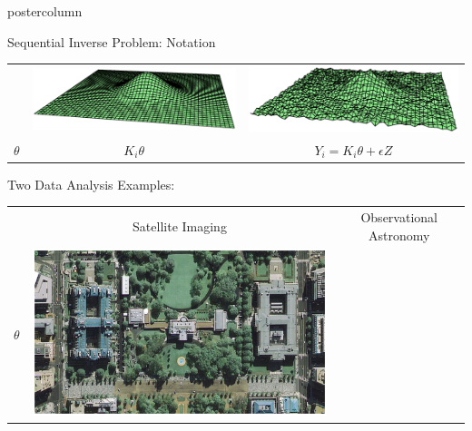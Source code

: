\documentclass[final]{beamer}
\begin{document}
\begin{frame}
\begin{columns}
\begin{column}{.32\textwidth}
\begin{beamercolorbox}[center,wd=\textwidth]{postercolumn}
\begin{minipage}[T]{.95\textwidth}
{\begin{block}{Sequential Inverse Problem: Notation}
\begin{table}
\begin{tabular}{ccc}
& \includegraphics[width=2.6in,trim=100 225 0 235,clip]{./figures/inverseProblemEx2c.eps} 
& \includegraphics[width=2.6in,trim=100 225 0 235,clip]{./figures/inverseProblemEx3c.eps} \\
$\theta$ & $K_i\theta$ & $Y_i = K_i\theta + \epsilon Z$ 
\end{tabular}
\end{table}
            \end{block}
            \begin{block}{Two Data Analysis Examples: }
              \begin{table}
                \centering
                \begin{tabular}{c c c}
                  \begin{minipage}[r][1.5in][c]{3cm}
                  \end{minipage} &
                  \begin{minipage}[c][1.5in][c]{6in}
                  \textcolor{green!50!black}{Satellite Imaging}
                  \end{minipage} &
                  \begin{minipage}[c][1.5in][c]{6in}
                  \textcolor{green!50!black}{Observational Astronomy}
                  \end{minipage} 
                  \\
                  \begin{minipage}[r][2.5in][c]{3cm}
                  $\theta$
                  \end{minipage} &
                  \begin{minipage}[c][2.5in][c]{6in}
                    \includegraphics[width=5in,trim=80 130 80 90,clip]{./figures/satelliteColor.eps}

\end{minipage}
\end{tabular}
\end{table}
\end{block}}
\end{minipage}
\end{beamercolorbox}
\end{column}
\end{columns}
\end{frame}
\end{document}
